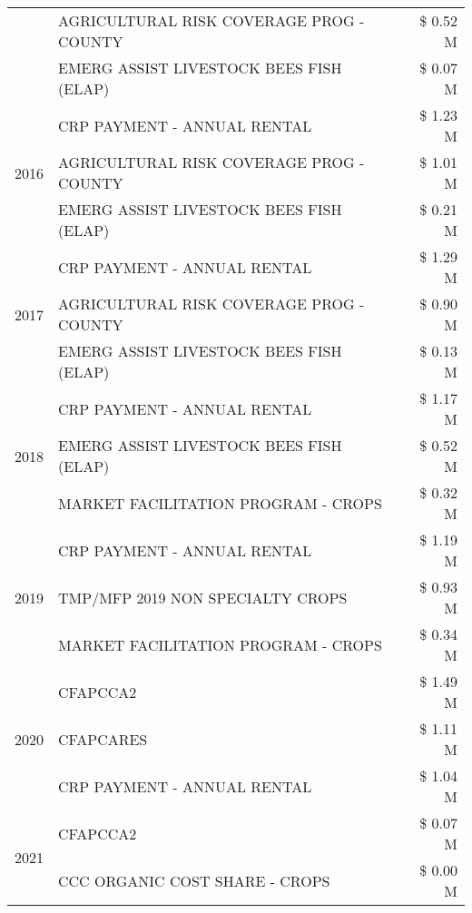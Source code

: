 \begin{tabular}{llr}
 & AGRICULTURAL RISK COVERAGE PROG - COUNTY & \$ 0.52 M \\
 & EMERG ASSIST LIVESTOCK BEES FISH (ELAP) & \$ 0.07 M \\
\cline{1-3}
\multirow[t]{3}{*}{2016} & CRP PAYMENT - ANNUAL RENTAL & \$ 1.23 M \\
 & AGRICULTURAL RISK COVERAGE PROG - COUNTY & \$ 1.01 M \\
 & EMERG ASSIST LIVESTOCK BEES FISH (ELAP) & \$ 0.21 M \\
\cline{1-3}
\multirow[t]{3}{*}{2017} & CRP PAYMENT - ANNUAL RENTAL & \$ 1.29 M \\
 & AGRICULTURAL RISK COVERAGE PROG - COUNTY & \$ 0.90 M \\
 & EMERG ASSIST LIVESTOCK BEES FISH (ELAP) & \$ 0.13 M \\
\cline{1-3}
\multirow[t]{3}{*}{2018} & CRP PAYMENT - ANNUAL RENTAL & \$ 1.17 M \\
 & EMERG ASSIST LIVESTOCK BEES FISH (ELAP) & \$ 0.52 M \\
 & MARKET FACILITATION PROGRAM - CROPS & \$ 0.32 M \\
\cline{1-3}
\multirow[t]{3}{*}{2019} & CRP PAYMENT - ANNUAL RENTAL & \$ 1.19 M \\
 & TMP/MFP 2019 NON SPECIALTY CROPS & \$ 0.93 M \\
 & MARKET FACILITATION PROGRAM - CROPS & \$ 0.34 M \\
\cline{1-3}
\multirow[t]{3}{*}{2020} & CFAPCCA2 & \$ 1.49 M \\
 & CFAPCARES & \$ 1.11 M \\
 & CRP PAYMENT - ANNUAL RENTAL & \$ 1.04 M \\
\cline{1-3}
\multirow[t]{2}{*}{2021} & CFAPCCA2 & \$ 0.07 M \\
 & CCC ORGANIC COST SHARE - CROPS & \$ 0.00 M \\
\cline{1-3}
\bottomrule
\end{tabular}
